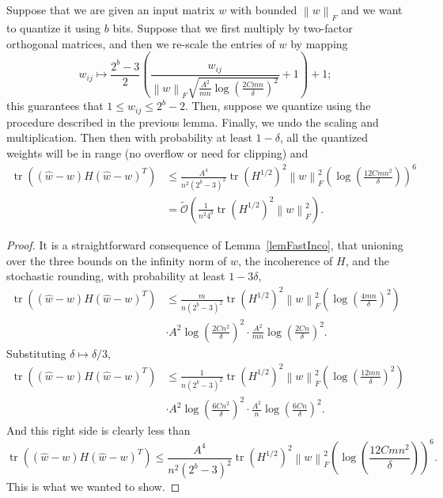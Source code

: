 \begin{toappendix}
\begin{theorem}
Suppose that we are given an input matrix $w$ with bounded $\left\|w\right\|_{F}$ and we want to quantize it using $b$ bits. Suppose that we first multiply by two-factor orthogonal matrices, and then we re-scale the entries of $w$ by mapping
\[
	w_{ij} \mapsto \frac{2^b - 3}{2} \left( \frac{w_{ij}}{\left\|w\right\|_F \sqrt{ \frac{A^2}{mn} \log\left( \frac{2C m n}{\delta} \right)^2 }} + 1 \right) + 1;
\]
this guarantees that $1 \le w_{ij} \le 2^b - 2$. Then, suppose we quantize using the procedure described in the previous lemma. Finally, we undo the scaling and multiplication. Then then with probability at least $1 - \delta$, all the quantized weights will be in range (no overflow or need for clipping) and
\begin{align*}
	\operatorname{tr}\left( (\hat w - w) H (\hat w - w)^T \right) &\le \frac{A^4}{n^2 (2^b - 3)^2} \operatorname{tr}\left(H^{1/2}\right)^2 \left\|w\right\|_{F}^2 \left( \log\left( \frac{12 C m n^2}{\delta}\right) \right)^6
	\\&=
	\tilde{\mathcal{O}}\left( \frac{1}{n^2 4^b} \operatorname{tr}\left(H^{1/2}\right)^2 \left\|w\right\|_{F}^2 \right).
\end{align*}
\end{theorem}
\begin{proof}
It is a straightforward consequence of Lemma~\ref{lemFastInco}, that unioning over the three bounds on the infinity norm of $w$, the incoherence of $H$, and the stochastic rounding, with probability at least $1 - 3 \delta$,
\begin{align*}
\operatorname{tr}\left( (\hat w - w) H (\hat w - w)^T \right) &\le \frac{m}{n (2^b - 3)^2} \operatorname{tr}\left(H^{1/2}\right)^2 \left\|w\right\|_{F}^2 \left( \log\left( \frac{4 mn}{\delta}\right)^2 \right) \\&\cdot A^2 \log\left(\frac{2 C n^2}{\delta}\right)^2 \cdot  \frac{A^2}{mn} \log\left( \frac{2 C n}{\delta} \right)^2.
\end{align*}
Substituting $\delta \mapsto \delta/3$, 
\begin{align*}
	\operatorname{tr}\left( (\hat w - w) H (\hat w - w)^T \right) &\le \frac{1}{n (2^b - 3)^2} \operatorname{tr}\left(H^{1/2}\right)^2 \left\|w\right\|_{F}^2 \left( \log\left( \frac{12 mn}{\delta}\right)^2 \right) \\&\cdot A^2 \log\left(\frac{6 C n^2}{\delta}\right)^2 \cdot  \frac{A^2}{n} \log\left( \frac{6 C n}{\delta} \right)^2.
\end{align*}
And this right side is clearly less than
\[
	\operatorname{tr}\left( (\hat w - w) H (\hat w - w)^T \right) \le \frac{A^4}{n^2 (2^b - 3)^2} \operatorname{tr}\left(H^{1/2}\right)^2 \left\|w\right\|_{F}^2 \left( \log\left( \frac{12 C m n^2}{\delta}\right) \right)^6.
\]
This is what we wanted to show.
\end{proof}

\end{toappendix}

